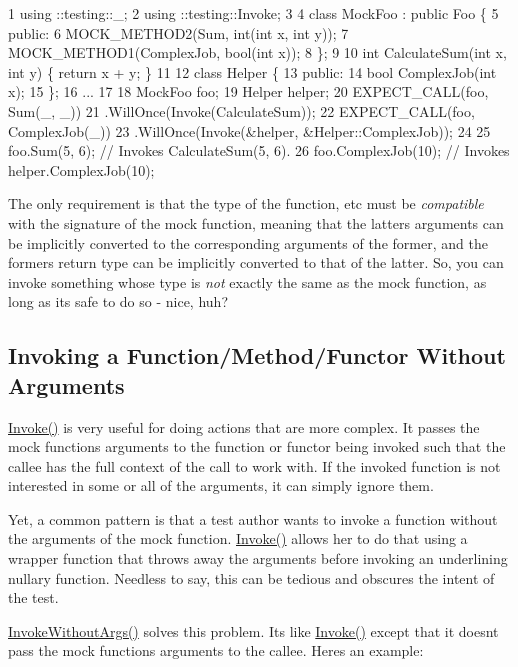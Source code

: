 \begin{DoxyCode}
1 using ::testing::\_;
2 using ::testing::Invoke;
3 
4 class MockFoo : public Foo \{
5  public:
6   MOCK\_METHOD2(Sum, int(int x, int y));
7   MOCK\_METHOD1(ComplexJob, bool(int x));
8 \};
9 
10 int CalculateSum(int x, int y) \{ return x + y; \}
11 
12 class Helper \{
13  public:
14   bool ComplexJob(int x);
15 \};
16 ...
17 
18   MockFoo foo;
19   Helper helper;
20   EXPECT\_CALL(foo, Sum(\_, \_))
21       .WillOnce(Invoke(CalculateSum));
22   EXPECT\_CALL(foo, ComplexJob(\_))
23       .WillOnce(Invoke(&helper, &Helper::ComplexJob));
24 
25   foo.Sum(5, 6);       // Invokes CalculateSum(5, 6).
26   foo.ComplexJob(10);  // Invokes helper.ComplexJob(10);
\end{DoxyCode}


The only requirement is that the type of the function, etc must be {\itshape compatible} with the signature of the mock function, meaning that the latter\textquotesingle{}s arguments can be implicitly converted to the corresponding arguments of the former, and the former\textquotesingle{}s return type can be implicitly converted to that of the latter. So, you can invoke something whose type is {\itshape not} exactly the same as the mock function, as long as it\textquotesingle{}s safe to do so -\/ nice, huh?

\subsection*{Invoking a Function/\+Method/\+Functor Without Arguments}

{\ttfamily \hyperlink{namespacetesting_a12aebaf8363d49a383047529f798b694}{Invoke()}} is very useful for doing actions that are more complex. It passes the mock function\textquotesingle{}s arguments to the function or functor being invoked such that the callee has the full context of the call to work with. If the invoked function is not interested in some or all of the arguments, it can simply ignore them.

Yet, a common pattern is that a test author wants to invoke a function without the arguments of the mock function. {\ttfamily \hyperlink{namespacetesting_a12aebaf8363d49a383047529f798b694}{Invoke()}} allows her to do that using a wrapper function that throws away the arguments before invoking an underlining nullary function. Needless to say, this can be tedious and obscures the intent of the test.

{\ttfamily \hyperlink{namespacetesting_a88cc1999296bc630f6a49cdf66bb21f9}{Invoke\+Without\+Args()}} solves this problem. It\textquotesingle{}s like {\ttfamily \hyperlink{namespacetesting_a12aebaf8363d49a383047529f798b694}{Invoke()}} except that it doesn\textquotesingle{}t pass the mock function\textquotesingle{}s arguments to the callee. Here\textquotesingle{}s an example\+:


